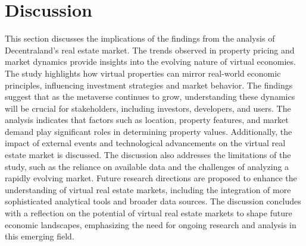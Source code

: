 \section{Discussion}
This section discusses the implications of the findings from the analysis of Decentraland's real estate market. The trends observed in property pricing and market dynamics provide insights into the evolving nature of virtual economies. The study highlights how virtual properties can mirror real-world economic principles, influencing investment strategies and market behavior.
The findings suggest that as the metaverse continues to grow, understanding these dynamics will be crucial for stakeholders, including investors, developers, and users. The analysis indicates that factors such as location, property features, and market demand play significant roles in determining property values. Additionally, the impact of external events and technological advancements on the virtual real estate market is discussed.
The discussion also addresses the limitations of the study, such as the reliance on available data and the challenges of analyzing a rapidly evolving market. Future research directions are proposed to enhance the understanding of virtual real estate markets, including the integration of more sophisticated analytical tools and broader data sources.
The discussion concludes with a reflection on the potential of virtual real estate markets to shape future economic landscapes, emphasizing the need for ongoing research and analysis in this emerging field.